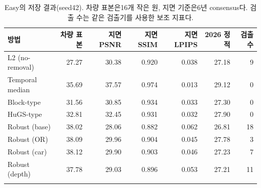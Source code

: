 \begin{table}[htbp]\centering\scriptsize
\caption{Easy의 저장 결과(seed42). 차량 표본은16개 작은 원, 지면 기준은6년 consensus다. 검출 수는 같은 검출기를 사용한 보조 지표다.}
\begin{tabular}{lrrrrrr}\toprule
방법 & 차량 표본 & 지면 PSNR & 지면 SSIM & 지면 LPIPS & 2026 정적 & 검출 수\\\midrule
L2 (no-removal) & 27.27 & 30.38 & 0.920 & 0.038 & 27.18 & 9 \\
Temporal median & 35.69 & 37.57 & 0.974 & 0.013 & 29.12 & 0 \\
Block-type & 31.56 & 30.85 & 0.934 & 0.033 & 27.30 & 0 \\
HuGS-type & 32.81 & 32.45 & 0.931 & 0.032 & 27.90 & 0 \\
Robust (base) & 38.02 & 28.06 & 0.882 & 0.062 & 26.81 & 18 \\
Robust (OR) & 38.09 & 29.96 & 0.904 & 0.045 & 27.78 & 3 \\
Robust (car) & 38.12 & 29.90 & 0.903 & 0.046 & 27.23 & 7 \\
Robust (depth) & 37.78 & 29.03 & 0.896 & 0.053 & 27.21 & 11 \\ \\[-6pt]\bottomrule\end{tabular}
\end{table}
